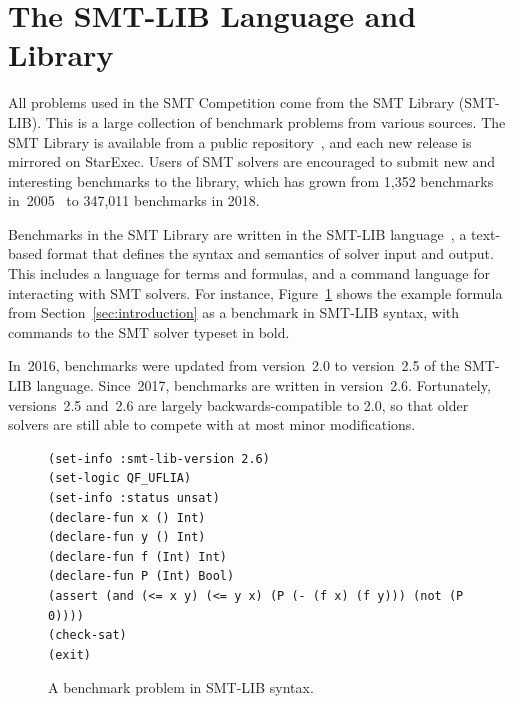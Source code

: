 \documentclass[dvipsnames,table,twoside,11pt]{article}
\begin{document}

\section{The SMT-LIB Language and Library}
\label{sec:smtlib}

All problems used in the SMT Competition come from the SMT Library
(SMT-LIB).  This is a large collection of benchmark problems from
various sources.  The SMT Library is available from a public
repository~\cite{smtlib-repository}, and each new release is mirrored
on StarExec.  Users of SMT solvers are encouraged to submit new and
interesting benchmarks to the library, which has grown from 1,352
benchmarks in~2005~\cite{BdMS05} to 347,011 benchmarks in 2018.

Benchmarks in the SMT Library are written in the SMT-LIB
language~\cite{BarFT-RR-17}, a text-based format that defines the
syntax and semantics of solver input and output.  This includes a
language for terms and formulas, and a command language for
interacting with SMT solvers.  For instance,
Figure~\ref{fig:smtlib-example} shows the example formula from
Section~\ref{sec:introduction} as a benchmark in SMT-LIB syntax, with
commands to the SMT solver typeset in bold.

In~2016, benchmarks were updated from version~2.0 to version~2.5 of
the SMT-LIB language.  Since~2017, benchmarks are written in
version~2.6.  Fortunately, versions~2.5 and~2.6 are largely
backwards-compatible to 2.0, so that older solvers are still able to
compete with at most minor modifications.

\begin{figure}
\begin{lstlisting}
(set-info :smt-lib-version 2.6)
(set-logic QF_UFLIA)
(set-info :status unsat)
(declare-fun x () Int)
(declare-fun y () Int)
(declare-fun f (Int) Int)
(declare-fun P (Int) Bool)
(assert (and (<= x y) (<= y x) (P (- (f x) (f y))) (not (P 0))))
(check-sat)
(exit)
\end{lstlisting}
\caption{A benchmark problem in SMT-LIB syntax.}
\label{fig:smtlib-example}
\end{figure}
\end{document}
